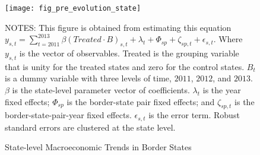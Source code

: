 \begin{figure}[H]
    \centering
    \texttt{[image: fig\_pre\_evolution\_state]}
    \caption{State-level Macroeconomic Trends in Border States}
    \label{fig:state-level-macroeconomic-trends-in-border-states}
    \begin{minipage}{14cm}
        \vspace{0.05in}
        \tiny NOTES: This figure is obtained from estimating this equation $y_{s,t} = \sum_{t = 2011}^{2013} \beta (Treated \cdot B)_{s,t} + \lambda_{t} + \Phi_{sp} + \zeta_{sp,t} + \epsilon_{s,t}$. Where $y_{s,t}$ is the vector of observables. Treated is the grouping variable that is unity for the treated states and zero for the control states. $B_{t}$ is a dummy variable with three levels of time, $2011$, $2012$, and $2013$. $\beta$ is the state-level parameter vector of coefficients. $\lambda_{t}$ is the year fixed effects; $\Phi_{sp}$ is the border-state pair fixed effects; and $\zeta_{sp,t}$ is the border-state-pair-year fixed effects. $\epsilon_{s,t}$ is the error term. Robust standard errors are clustered at the state level.
    \end{minipage}
\end{figure}